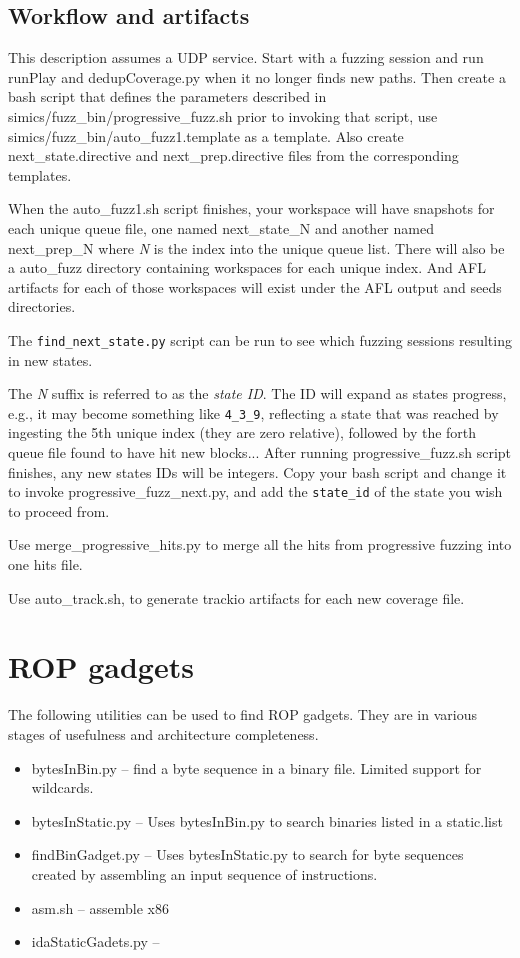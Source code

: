 \documentclass[titlepage]{article}
\begin{document}
\begin{appendices}
\subsection{Workflow and artifacts}
This description assumes a UDP service.
Start with a fuzzing session and run runPlay and dedupCoverage.py when it no longer finds new paths.
Then create a bash script that defines the parameters described in simics/fuzz\_bin/progressive\_fuzz.sh prior to invoking that 
script, use simics/fuzz\_bin/auto\_fuzz1.template as a template. Also create next\_state.directive and next\_prep.directive files
from the corresponding templates.

When the auto\_fuzz1.sh script finishes, your workspace will have snapshots for each unique queue file, 
one named next\_state\_N and another
named next\_prep\_N where \textit{N} is the index into the unique queue list.  There will also be a auto\_fuzz directory containing
workspaces for each unique index.  And AFL artifacts for each of those workspaces will exist under the AFL output and seeds directories.

The {\tt find\_next\_state.py} script can be run to see which fuzzing sessions resulting in new states.

The \textit{N} suffix is referred to as the \textit{state ID}.  The ID will expand as states progress, e.g., it may become something like {\tt 4\_3\_9},
reflecting a state that was reached by ingesting the 5th unique index (they are zero relative), followed by the forth queue file found to have hit new blocks...
After running progressive\_fuzz.sh script finishes, any new states IDs will be integers.  Copy your bash script and change it to invoke
progressive\_fuzz\_next.py, and add the {\tt state\_id} of the state you wish to proceed from. 

Use merge\_progressive\_hits.py to merge all the hits from progressive fuzzing into one hits file.

Use auto\_track.sh, to generate trackio artifacts for each new coverage file.

\section{ROP gadgets}
The following utilities can be used to find ROP gadgets.  They are in various stages of usefulness and architecture completeness.
\begin{itemize}
\item bytesInBin.py -- find a byte sequence in a binary file.  Limited support for wildcards.
\item bytesInStatic.py -- Uses bytesInBin.py to search binaries listed in a static.list
\item findBinGadget.py -- Uses bytesInStatic.py to search for byte sequences created by assembling an input sequence of instructions.
\item asm.sh -- assemble x86 
\item idaStaticGadets.py -- 
\end{itemize}


\end{appendices}
\end{document}

